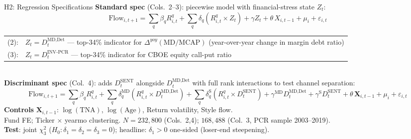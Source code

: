 \documentclass[10pt, aspectratio=169]{beamer}
\begin{document}
\begin{frame}{H2: Regression Specifications}
  \footnotesize\textbf{Standard spec} (Cols.\ 2--3): piecewise model with financial-stress state $Z_t$:
  \vspace{-2pt}
  \[
    \text{Flow}_{i,t+1} = \sum_q \beta_q R^q_{i,t}
    + \sum_q \delta_q (R^q_{i,t}\times Z_t)
    + \gamma Z_t + \theta\,X_{i,t-1} + \mu_i + \varepsilon_{i,t}
  \]
  \vspace{-2pt}
  \begin{tabular}{@{}ll@{}}
(2): & $Z_t = D^{\text{MD,Det}}_t$ — top-34\% indicator for $\Delta^{yoy}(\text{MD}/\text{MCAP})$ (year-over-year change in margin debt ratio) \\
    (3): & $Z_t = D^{\text{INV-PCR}}_t$ — top-34\% indicator for CBOE equity call-put ratio \\
  \end{tabular}\\[5pt]
  \footnotesize\textbf{Discriminant spec} (Col.\ 4): adds $D^{\text{SENT}}_t$ alongside $D^{\text{MD,Det}}_t$ with full rank interactions to test channel separation:
  \vspace{-2pt}
  \[
    \text{Flow}_{i,t+1} = \sum_q \beta_q R^q_{i,t}
    + \sum_q \delta^{\text{MD}}_q (R^q_{i,t}\times D^{\text{MD,Det}}_t)
    + \sum_q \delta^{\text{S}}_q (R^q_{i,t}\times D^{\text{SENT}}_t)
    + \gamma^{\text{MD}} D^{\text{MD,Det}}_t + \gamma^{\text{S}} D^{\text{SENT}}_t
    + \theta\,\mathbf{X}_{i,t-1} + \mu_i + \varepsilon_{i,t}
  \]
  \vspace{-2pt}
  \footnotesize\textbf{Controls} $\mathbf{X}_{i,t-1}$: $\log(\text{TNA})$, $\log(\text{Age})$, Return volatility, Style flow.\\
  \vspace{4pt}
  Fund FE; Ticker $\times$ yearmo clustering. $N=232{,}800$ (Cols.\ 2,4); $168{,}488$ (Col.\ 3, PCR sample 2003--2019).\\
  \vspace{4pt}
  \textbf{Test}: joint $\chi^2_3$ ($H_0: \delta_1=\delta_2=\delta_3=0$); headline: $\delta_1 > 0$ one-sided (loser-end steepening).
\end{frame}
\end{document}
